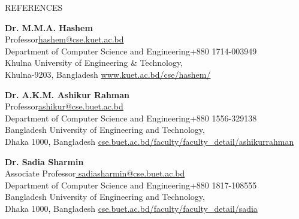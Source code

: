 \documentclass{resume} %
\begin{document}
\begin{rSection}{REFERENCES}
\item \textbf{Dr. M.M.A. Hashem}\\{Professor}\hfill{\href{mailto:hashem@cse.kuet.ac.bd}{hashem@cse.kuet.ac.bd}}\\
{Department of Computer Science and Engineering}\hfill{+880 1714-003949}\\
{Khulna University of Engineering \& Technology,\\
Khulna-9203, Bangladesh} \hfill{\href{https:www.kuet.ac.bd/cse/hashem/}{www.kuet.ac.bd/cse/hashem/}}

\item \textbf{Dr. A.K.M. Ashikur Rahman}\\{Professor}\hfill{\href{mailto: ashikur@cse.buet.ac.bd}{ashikur@cse.buet.ac.bd}}\\
{Department of Computer Science and Engineering}\hfill{+880 1556-329138}\\
{Bangladesh University of Engineering and Technology,\\
Dhaka 1000, Bangladesh} \hfill{\href{https://cse.buet.ac.bd/faculty/faculty_detail/ashikurrahman}{cse.buet.ac.bd/faculty/faculty\_detail/ashikurrahman}}

\item \textbf{Dr. Sadia Sharmin}\\{Associate Professor}\hfill{\href{mailto: sadiasharmin@cse.buet.ac.bd}{ sadiasharmin@cse.buet.ac.bd}}\\
{Department of Computer Science and Engineering}\hfill{+880 1817-108555}\\
{Bangladesh University of Engineering and Technology,\\
Dhaka 1000, Bangladesh} \hfill{\href{https://cse.buet.ac.bd/faculty/faculty_detail/sadia}{cse.buet.ac.bd/faculty/faculty\_detail/sadia}}


\end{rSection}


\end{document}
